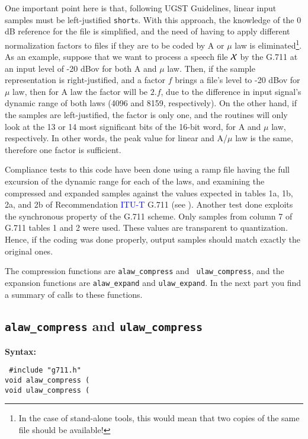One important point here is that, following UGST Guidelines, linear
input samples must be left-justified {\tt short}s. With this approach,
the knowledge of the 0 dB reference for the file is simplified, and the
need of having to apply different normalization factors to files if
they are to be coded by A or $\mu$ law is eliminated\footnote{\SF In
the case of stand-alone tools, this would mean that two copies of the
same file should be available!}. As an example, suppose that we want to
process a speech file $\cal X$ by the G.711 at an input level of -20
dBov for both A and $\mu$ law. Then, if the sample representation is
right-justified, and a factor $f$ brings a file's level to -20 dBov for
$\mu$ law, then for A law the factor will be $2.f$, due to the
difference in input signal's dynamic range of both laws (4096 and 8159,
respectively). On the other hand, if the samples are left-justified,
the factor is only one, and the routines will only look at the 13 or 14
most significant bits of the 16-bit word, for A and $\mu$ law,
respectively. In other words, the peak value for linear and A/$\mu$ law
is the same, therefore one factor is sufficient.

Compliance tests to this code have been done using a ramp file having
the full excursion of the dynamic range for each of the laws, and
examining the compressed and expanded samples against the values
expected in tables 1a, 1b, 2a, and 2b of Recommendation \textcolor{blue}{ITU-T} G.711 (see
\cite{G.711}). Another test done exploits the synchronous property of
the G.711 scheme. Only samples from column 7 of G.711 tables 1 and 2
were used. These values are transparent to quantization. Hence, if
the coding was done properly, output samples should match exactly the
original ones.

The compression functions are {\tt alaw\_compress} and {\tt
ulaw\_compress}, and the expansion functions are {\tt alaw\_expand} and
{\tt ulaw\_expand}. In the next part you find a summary of calls to
these functions.

\subsection{{\tt alaw\_compress} and {\tt ulaw\_compress}}

{\bf Syntax: } 

{\tt
\#include "g711.h"\\
void alaw\_compress
         (\\
void ulaw\_compress
         (
}

